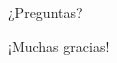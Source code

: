 \documentclass[10pt]{beamer}
\begin{document}
\begin{frame}[standout]
  ¿Preguntas?
\end{frame}

\begin{frame}[standout]
  ¡Muchas gracias!
\end{frame}

\end{document}
